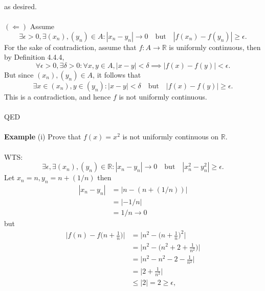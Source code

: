 \documentclass{article}
\begin{document}
            as desired.
            \\ \\
            $(\Leftarrow)$ Assume
            \begin{equation*}
                \exists \epsilon > 0, \exists (x_n),(y_n) \in A: |x_n-y_n| \to 0 \quad \text{but} \quad |f(x_n)-f(y_n)| \geq \epsilon.
            \end{equation*}
            For the sake of contradiction, assume that $f: A \to \mathbb{R}$ is uniformly continuous, then by Definition 4.4.4, 
            \begin{equation*}
                \forall \epsilon > 0, \exists \delta > 0: \forall x,y \in A, |x-y|<\delta \implies |f(x)-f(y)| < \epsilon.
            \end{equation*}
            But since $(x_n),(y_n) \in A$, it follows that
            \begin{equation*}
                \exists x\in (x_n),y \in (y_n): |x-y|<\delta \quad \text{but} \quad |f(x)-f(y)| \geq \epsilon.
            \end{equation*}
            This is a contradiction, and hence $f$ is not uniformly continuous. \\ \\
            QED
            \\ \\
            \textbf{Example} (i) Prove that $f(x)=x^2$ is not uniformly continuous on $\mathbb{R}$.
            \\ \\
            WTS: 
            \begin{equation*}
                \exists \epsilon, \exists (x_n),(y_n) \in \mathbb{R}: |x_n-y_n| \to 0 \quad \text{but} \quad |x_n^2-y_n^2| \geq \epsilon.
            \end{equation*}
            Let $x_n = n, y_n = n + (1/n)$ then
            \begin{align*}
                |x_n-y_n| & = |n - (n+(1/n))| \\
                & = |-1/n| \\
                & = 1/n \to 0
            \end{align*}
            but
            \begin{align*}
                \bigg|f(n)-f\bigg(n+\frac{1}{n}\bigg)\bigg| & = \bigg|n^2 - \bigg(n+\frac{1}{n}\bigg)^2\bigg| \\
                & = \bigg|n^2 - \bigg(n^2 + 2 + \frac{1}{n^2}\bigg)\bigg| \\
                & = \bigg|n^2 - n^2 -2 -\frac{1}{n^2}\bigg| \\
                & = \bigg|2+\frac{1}{n^2}\bigg| \\
                & \leq |2| = 2 \geq \epsilon,
            \end{align*}
\end{document}
